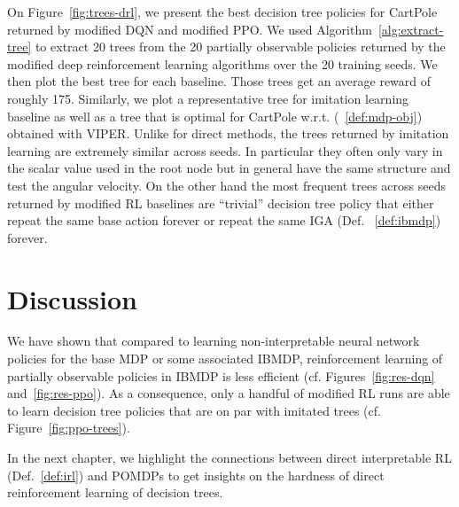 On Figure~\ref{fig:trees-drl}, we present the best decision tree policies for CartPole returned by modified DQN and modified PPO.
We used Algorithm~\ref{alg:extract-tree} to extract 20 trees from the 20 partially observable policies returned by the modified deep reinforcement learning algorithms over the 20 training seeds.
We then plot the best tree for each baseline.
Those trees get an average reward of roughly 175.
Similarly, we plot a representative tree for imitation learning baseline as well as a tree that is optimal for CartPole w.r.t. (~\ref{def:mdp-obj}) obtained with VIPER. 
Unlike for direct methods, the trees returned by imitation learning are extremely similar across seeds. In particular they often only vary in the scalar value used in the root node but in general have the same structure and test the angular velocity.
On the other hand the most frequent trees across seeds returned by modified RL baselines are ``trivial'' decision tree policy that either repeat the same base action forever or repeat the same IGA (Def. ~\ref{def:ibmdp}) forever.


\section{Discussion}
We have shown that compared to learning non-interpretable neural network policies for the base MDP or some associated IBMDP, reinforcement learning of partially observable policies in IBMDP is less efficient (cf. Figures~\ref{fig:res-dqn} and~\ref{fig:res-ppo}). 
As a consequence, only a handful of modified RL runs are able to learn decision tree policies that are on par with imitated trees (cf. Figure~\ref{fig:ppo-trees}).

In the next chapter, we highlight the connections between direct interpretable RL (Def.~\ref{def:irl}) and POMDPs to get insights on the hardness of direct reinforcement learning of decision trees.